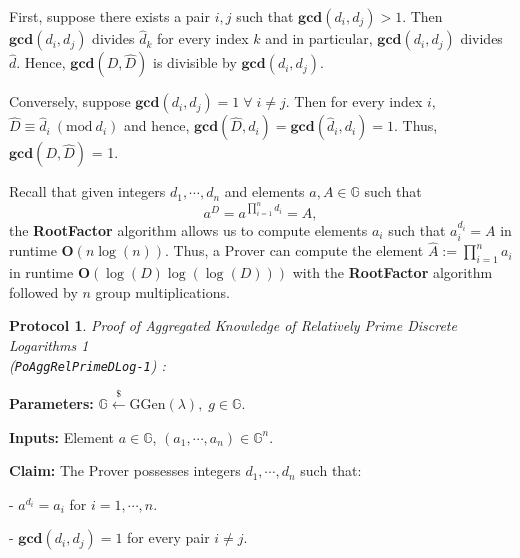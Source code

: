 \documentclass[11pt, lettersize, notitlepage, leqno, footskip=0.6cm]{article}
\newcommand{\pl}{\prod\limits}
\newcommand{\mb}{\mathbb}
\newcommand{\mbf}{\mathbf}
\newcommand{\mr}{\mathrm}
\newcommand{\lamb}{\lambda}
\newcommand{\what}{\widehat}
\newcommand{\vs}{\vspace{-0.15cm}}
\newcommand{\noin}{\noindent}
\newcommand{\Mod}[1]{\ (\mathrm{mod}\ #1)}
\newcommand{\GCD}{\mbf{gcd}}
\newtheorem{Prot}[Thm]{Protocol}
\numberwithin{equation}{section}
\begin{document}
\begin{prf} First, suppose there exists a pair $i,j$ such that $\GCD(d_i,d_j)> 1$. Then $\GCD(d_i,d_j)$ divides $\what{d}_k$ for every index $k$ and in particular, $\GCD(d_i,d_j)$ divides $\what{d}$. Hence, $\GCD(D,\what{D})$ is divisible by $\GCD(d_i,d_j)$.

Conversely, suppose $\GCD(d_i,d_j)=1\;\forall\;i\neq j$. Then for every index $i$, $\what{D}\equiv \what{d}_i\Mod{d_i} $ and hence, $\GCD(\what{D}, d_i) = \GCD(\what{d}_i, d_i) = 1$. Thus, $\GCD(D,\what{D})$ = 1.\end{prf}

\noin Recall that given integers $d_1,\cdots,d_n$ and elements $a,A\in\mb{G}$ such that \vs $$a^D = a^{\pl_{i=1}^n d_i} = A ,$$ the \textbf{RootFactor} algorithm allows us to compute elements $a_i$ such that $a_i^{d_i} = A$ in runtime $\mbf{O}(n\log(n))$. Thus, a Prover can compute the element $\what{A}:= \pl_{i=1}^n a_i$ in runtime $\mbf{O}(\log(D)\log(\log(D)))$ with the \textbf{RootFactor} algorithm followed by $n$ group multiplications.

\vspace{0.2cm}

\begin{Prot} \normalfont \textit{Proof of Aggregated Knowledge of Relatively Prime Discrete Logarithms} 1 \\(\verb|PoAggRelPrimeDLog-1|) :\end{Prot} \vspace{-0.3cm}

\noindent \textbf{Parameters:} $\mb{G}\xleftarrow{\$} \mr{GGen}(\lamb), \; g\in \mb{G}$.

\noindent \textbf{Inputs:} Element $a\in\mb{G}$, $(a_1,\cdots,a_n)\in \mb{G}^n$.

\noindent \textbf{Claim:} The Prover possesses integers $d_1,\cdots, d_n$ such that:

\noindent - $a^{d_i} = a_i$ for $i = 1,\cdots, n$.

\noindent - $\GCD(d_i, d_j) = 1$ for every pair $i\neq j$.
\end{document}

